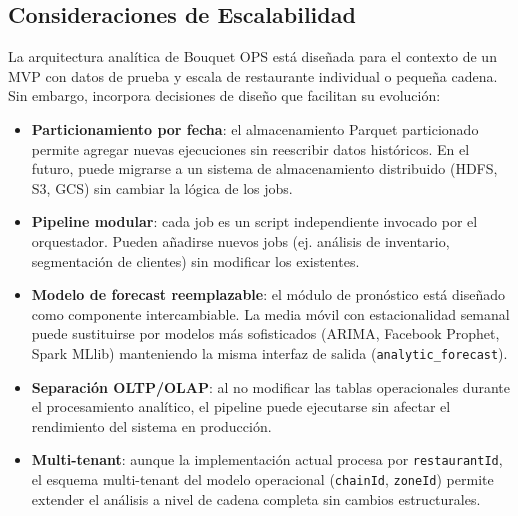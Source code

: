 \documentclass[12pt, letterpaper]{article}
\begin{document}
\subsection{Consideraciones de Escalabilidad}

La arquitectura analítica de Bouquet OPS está diseñada para el contexto de un MVP con datos de prueba y escala de restaurante individual o pequeña cadena. Sin embargo, incorpora decisiones de diseño que facilitan su evolución:

\begin{itemize}
  \item \textbf{Particionamiento por fecha}: el almacenamiento Parquet particionado permite agregar nuevas ejecuciones sin reescribir datos históricos. En el futuro, puede migrarse a un sistema de almacenamiento distribuido (HDFS, S3, GCS) sin cambiar la lógica de los jobs.

  \item \textbf{Pipeline modular}: cada job es un script independiente invocado por el orquestador. Pueden añadirse nuevos jobs (ej. análisis de inventario, segmentación de clientes) sin modificar los existentes.

  \item \textbf{Modelo de forecast reemplazable}: el módulo de pronóstico está diseñado como componente intercambiable. La media móvil con estacionalidad semanal puede sustituirse por modelos más sofisticados (ARIMA, Facebook Prophet, Spark MLlib) manteniendo la misma interfaz de salida (\texttt{analytic\_forecast}).

  \item \textbf{Separación OLTP/OLAP}: al no modificar las tablas operacionales durante el procesamiento analítico, el pipeline puede ejecutarse sin afectar el rendimiento del sistema en producción.

  \item \textbf{Multi-tenant}: aunque la implementación actual procesa por \texttt{restaurantId}, el esquema multi-tenant del modelo operacional (\texttt{chainId}, \texttt{zoneId}) permite extender el análisis a nivel de cadena completa sin cambios estructurales.
\end{itemize}
\end{document}
